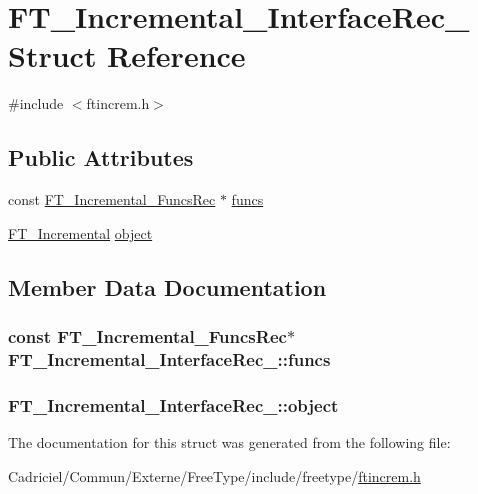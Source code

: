 \hypertarget{struct_f_t___incremental___interface_rec__}{\section{F\-T\-\_\-\-Incremental\-\_\-\-Interface\-Rec\-\_\- Struct Reference}
\label{struct_f_t___incremental___interface_rec__}
}


{\ttfamily \#include $<$ftincrem.\-h$>$}

\subsection*{Public Attributes}
\begin{DoxyCompactItemize}
\item 
const \hyperlink{ftincrem_8h_ad771ba070b5075413589049634803c8e}{F\-T\-\_\-\-Incremental\-\_\-\-Funcs\-Rec} $\ast$ \hyperlink{struct_f_t___incremental___interface_rec___acd254ae2bdd80b4c9218a484c6bc2a41}{funcs}
\item 
\hyperlink{ftincrem_8h_a2ec8ac9cacdca1f493e4c3c5d27ed3c4}{F\-T\-\_\-\-Incremental} \hyperlink{struct_f_t___incremental___interface_rec___ae4f527f53465ff84ad01b484fe721a88}{object}
\end{DoxyCompactItemize}


\subsection{Member Data Documentation}
\hypertarget{struct_f_t___incremental___interface_rec___acd254ae2bdd80b4c9218a484c6bc2a41}{
\subsubsection[{funcs}]{\setlength{\rightskip}{0pt plus 5cm}const {\bf F\-T\-\_\-\-Incremental\-\_\-\-Funcs\-Rec}$\ast$ F\-T\-\_\-\-Incremental\-\_\-\-Interface\-Rec\-\_\-\-::funcs}}\label{struct_f_t___incremental___interface_rec___acd254ae2bdd80b4c9218a484c6bc2a41}
\hypertarget{struct_f_t___incremental___interface_rec___ae4f527f53465ff84ad01b484fe721a88}{
\subsubsection[{object}]{ F\-T\-\_\-\-Incremental\-\_\-\-Interface\-Rec\-\_\-\-::object}}\label{struct_f_t___incremental___interface_rec___ae4f527f53465ff84ad01b484fe721a88}


The documentation for this struct was generated from the following file\-:\begin{DoxyCompactItemize}
\item 
Cadriciel/\-Commun/\-Externe/\-Free\-Type/include/freetype/\hyperlink{ftincrem_8h}{ftincrem.\-h}\end{DoxyCompactItemize}
